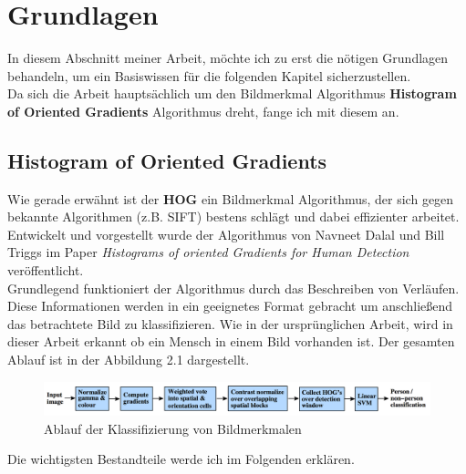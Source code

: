 \chapter{Grundlagen}
\label{chap:grundlagen}

In diesem Abschnitt meiner Arbeit, möchte ich zu erst die nötigen Grundlagen behandeln, um ein Basiswissen für die folgenden Kapitel sicherzustellen.\\
Da sich die Arbeit hauptsächlich um den Bildmerkmal Algorithmus \textbf{Histogram of Oriented Gradients} Algorithmus dreht, fange ich mit diesem an.
\section{Histogram of Oriented Gradients}
\label{sec:grundlagenhog}
Wie gerade erwähnt ist der \textbf{HOG} ein Bildmerkmal Algorithmus, der sich gegen bekannte Algorithmen (z.B. SIFT) bestens schlägt und dabei  effizienter arbeitet. Entwickelt und vorgestellt wurde der Algorithmus von Navneet Dalal und Bill Triggs im Paper \emph{Histograms of oriented Gradients for Human Detection} \cite{dalal:inria-00548512} veröffentlicht.\\
Grundlegend funktioniert der Algorithmus durch das Beschreiben von Verläufen. Diese Informationen werden in ein geeignetes Format gebracht um anschließend das betrachtete Bild zu klassifizieren. Wie in der ursprünglichen Arbeit, wird in dieser Arbeit erkannt ob ein Mensch in  einem Bild vorhanden ist. Der gesamten Ablauf ist in der Abbildung 2.1 dargestellt. \cite{dalal:inria-00548512}
\begin{figure}[htbp]\centering
	\includegraphics[width=1\linewidth]{./pics/featureextractionchain.png} 
	\caption{Ablauf der Klassifizierung von Bildmerkmalen}
	\label{fig:grundlagen_feature_extraction_chain}
\end{figure}

Die wichtigsten Bestandteile werde ich im Folgenden erklären.

